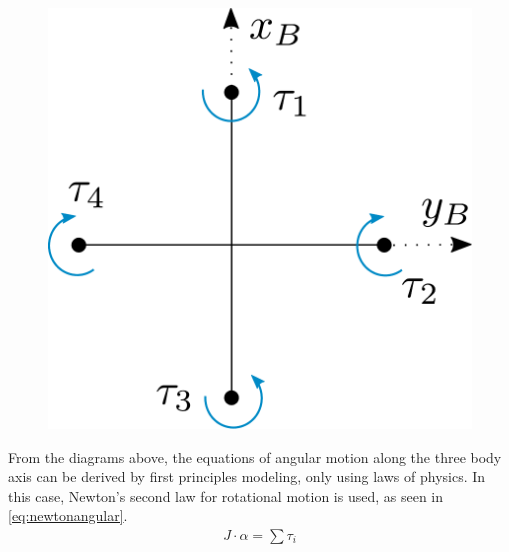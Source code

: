 \begin{minipage}{\linewidth}
\begin{minipage}{0.6\linewidth}
\begin{figure}[H]
			\label{fig:droneDiagram}
		\end{figure}
	\end{minipage}
	\hspace{0.03\linewidth}
	\begin{minipage}{0.35\linewidth}
		\begin{figure}[H] \vspace{20mm}
			\includegraphics[scale=.4]{figures/torquesDiagram}
			\centering
            \vspace{10mm}
			\label{fig:torquesDiagram}
		\end{figure}
	\end{minipage}
\end{minipage}

From the diagrams above, the equations of angular motion along the three body axis can be derived by first principles modeling, only using laws of physics. In this case, Newton's second law for rotational motion is used, as seen in \autoref{eq:newtonangular}.
%
\begin{align}
	J\cdot\alpha=\sum\tau_i
	\label{eq:newtonangular}
\end{align}
\begin{where}
\end{where}

